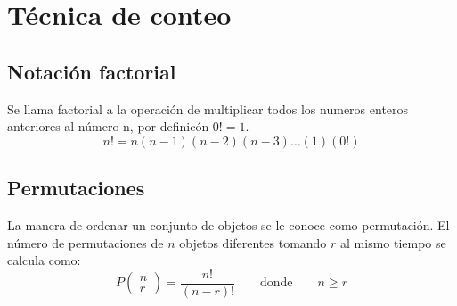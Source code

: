 \section{Técnica de conteo}
\subsection{Notación factorial}
Se llama factorial a la operación de multiplicar todos los numeros enteros anteriores al número n, por definicón $0!=1$.
\begin{equation*}
    n!=n(n-1)(n-2)(n-3)\dots(1)(0!)
\end{equation*}
\subsection{Permutaciones}
La manera de ordenar un conjunto de objetos se le conoce como permutación. El número de permutaciones de $n$ objetos diferentes tomando $r$ al mismo tiempo se calcula como:
\begin{equation*}
    P\left(\begin{matrix}
            n \\
            r\end{matrix}\right) = \frac{n!}{(n-r)!} \qquad \text{donde} \qquad n\geq r
\end{equation*}
